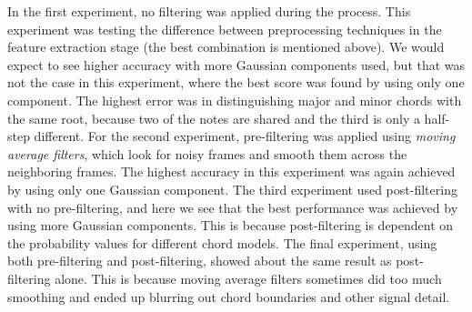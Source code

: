 \documentclass{sig-alternate}
\begin{document}
In the first experiment, no filtering was applied during the process. This experiment was testing the difference between preprocessing techniques in the feature extraction stage (the best combination is mentioned above). We would expect to see higher accuracy with more Gaussian components used, but that was not the case in this experiment, where the best score was found by using only one component. The highest error was in distinguishing major and minor chords with the same root, because two of the notes are shared and the third is only a half-step different. For the second experiment, pre-filtering was applied using \textit{moving average filters}, which look for noisy frames and smooth them across the neighboring frames. The highest accuracy in this experiment was again achieved by using only one Gaussian component. The third experiment used post-filtering with no pre-filtering, and here we see that the best performance was achieved by using more Gaussian components. This is because post-filtering is dependent on the probability values for different chord models. The final experiment, using both pre-filtering and post-filtering, showed about the same result as post-filtering alone. This is because moving average filters sometimes did too much smoothing and ended up blurring out chord boundaries and other signal detail.


\end{document}
